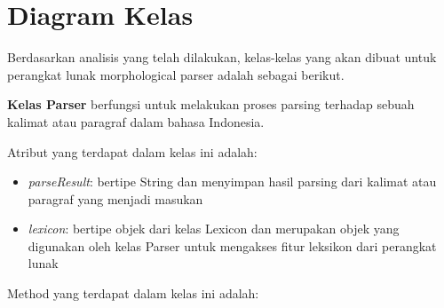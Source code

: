 \section{Diagram Kelas}
\label{sec:DiagramKelasAwal}

Berdasarkan analisis yang telah dilakukan, kelas-kelas yang akan dibuat untuk perangkat lunak morphological parser adalah sebagai berikut.

\textbf{Kelas Parser} berfungsi untuk melakukan proses parsing terhadap sebuah kalimat atau paragraf dalam bahasa Indonesia.

Atribut yang terdapat dalam kelas ini adalah:

\begin{itemize}
	\item \textit{parseResult}: bertipe String dan menyimpan hasil parsing dari kalimat atau paragraf yang menjadi masukan
	\item \textit{lexicon}: bertipe objek dari kelas Lexicon dan merupakan objek yang digunakan oleh kelas Parser untuk mengakses fitur leksikon dari perangkat lunak
\end{itemize}

Method yang terdapat dalam kelas ini adalah:

